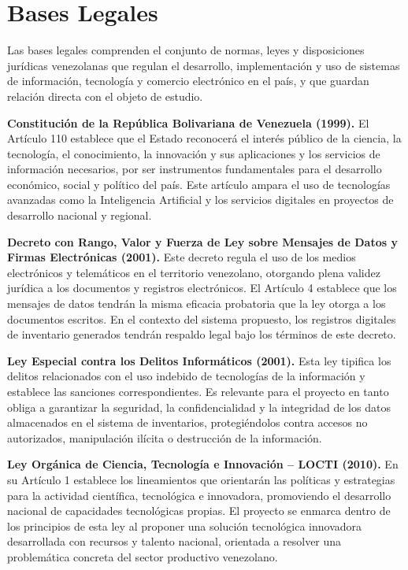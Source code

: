 \documentclass[12pt, letterpaper]{report}
\begin{document}
\section{Bases Legales}

Las bases legales comprenden el conjunto de normas, leyes y
disposiciones jurídicas venezolanas que regulan el desarrollo,
implementación y uso de sistemas de información, tecnología y comercio
electrónico en el país, y que guardan relación directa con el objeto
de estudio.

\textbf{Constitución de la República Bolivariana de Venezuela (1999).}
El Artículo 110 establece que el Estado reconocerá el interés público
de la ciencia, la tecnología, el conocimiento, la innovación y sus
aplicaciones y los servicios de información necesarios, por ser
instrumentos fundamentales para el desarrollo económico, social y
político del país. Este artículo ampara el uso de tecnologías avanzadas
como la Inteligencia Artificial y los servicios digitales en proyectos
de desarrollo nacional y regional.

\textbf{Decreto con Rango, Valor y Fuerza de Ley sobre Mensajes de
Datos y Firmas Electrónicas (2001).} Este decreto regula el uso de los
medios electrónicos y telemáticos en el territorio venezolano, otorgando
plena validez jurídica a los documentos y registros electrónicos. El
Artículo 4 establece que los mensajes de datos tendrán la misma eficacia
probatoria que la ley otorga a los documentos escritos. En el contexto
del sistema propuesto, los registros digitales de inventario generados
tendrán respaldo legal bajo los términos de este decreto.

\textbf{Ley Especial contra los Delitos Informáticos (2001).} Esta ley
tipifica los delitos relacionados con el uso indebido de tecnologías
de la información y establece las sanciones correspondientes. Es
relevante para el proyecto en tanto obliga a garantizar la seguridad,
la confidencialidad y la integridad de los datos almacenados en el
sistema de inventarios, protegiéndolos contra accesos no autorizados,
manipulación ilícita o destrucción de la información.

\textbf{Ley Orgánica de Ciencia, Tecnología e Innovación -- LOCTI
(2010).} En su Artículo 1 establece los lineamientos que orientarán
las políticas y estrategias para la actividad científica, tecnológica
e innovadora, promoviendo el desarrollo nacional de capacidades
tecnológicas propias. El proyecto se enmarca dentro de los principios
de esta ley al proponer una solución tecnológica innovadora desarrollada
con recursos y talento nacional, orientada a resolver una problemática
concreta del sector productivo venezolano.
\end{document}
